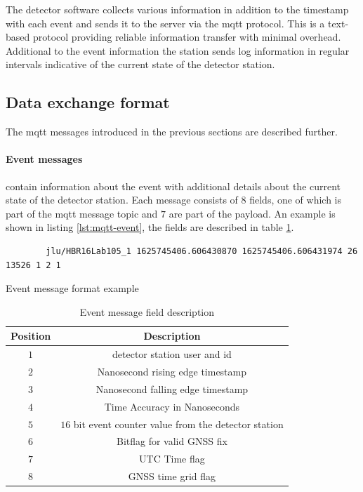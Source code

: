 \documentclass[abstract,toc,los,lof,english,10pt,glossary,acronyms,lotl]{jluthesis}
\begin{document}
The detector software collects various information in addition to the timestamp with each event and sends it to the server via the \acrfull{mqtt} protocol. This is a text-based protocol providing reliable information transfer with minimal overhead\cite{mqtt}. Additional to the event information the station sends log information in regular intervals indicative of the current state of the detector station.
\subsection{Data exchange format}
The \acrshort{mqtt} messages introduced in the previous sections are described further.

\paragraph{Event messages} contain information about the event with additional details about the current state of the detector station. Each message consists of $8$ fields, one of which is part of the \acrshort{mqtt} message topic and $7$ are part of the payload. An example is shown in listing \ref{lst:mqtt-event}, the fields are described in table \ref{tab:event-message}.
\begin{lstfloat}[H]
	\centering
	\begin{verbatim}
		jlu/HBR16Lab105_1 1625745406.606430870 1625745406.606431974 26 13526 1 2 1
	\end{verbatim}
	\caption{Event message format example}
	\label{lst:mqtt-event}
\end{lstfloat}
\begin{table}[H]
	\centering
	\begin{tabular}{| c | c |}
		\hline
		\textbf{Position} & \textbf{Description} \\
		\hline
		$1$ & detector station user and id \\
		\hline
		$2$ & Nanosecond rising edge timestamp \\
		\hline
		$3$ & Nanosecond falling edge timestamp \\
		\hline
		$4$ & Time Accuracy in Nanoseconds \\
		\hline
		$5$ & $16$ bit event counter value from the detector station \\
		\hline
		$6$ & Bitflag for valid GNSS fix \\
		\hline
		$7$ & UTC Time flag \\
		\hline
		$8$ & GNSS time grid flag \\
		\hline
	\end{tabular}
	\caption{Event message field description}
	\label{tab:event-message}
\end{table}
\end{document}
